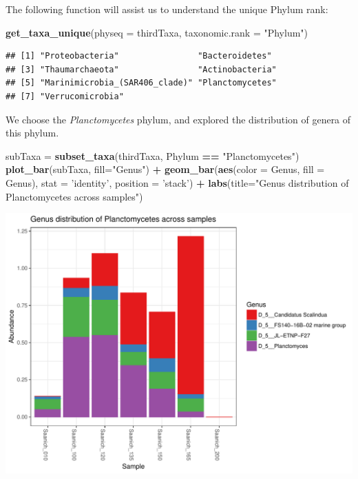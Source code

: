 \documentclass[11 pt,]{article}
\newenvironment{Shaded}{\begin{snugshade}}{\end{snugshade}}
\newcommand{\KeywordTok}[1]{\textcolor[rgb]{0.13,0.29,0.53}{\textbf{#1}}}
\newcommand{\DataTypeTok}[1]{\textcolor[rgb]{0.13,0.29,0.53}{#1}}
\newcommand{\StringTok}[1]{\textcolor[rgb]{0.31,0.60,0.02}{#1}}
\newcommand{\OperatorTok}[1]{\textcolor[rgb]{0.81,0.36,0.00}{\textbf{#1}}}
\newcommand{\NormalTok}[1]{#1}
\begin{document}
The following function will assist us to understand the unique Phylum
rank:

\begin{Shaded}
\begin{Highlighting}[]
\KeywordTok{get_taxa_unique}\NormalTok{(}\DataTypeTok{physeq =}\NormalTok{ thirdTaxa, }\DataTypeTok{taxonomic.rank =} \StringTok{"Phylum"}\NormalTok{)}
\end{Highlighting}
\end{Shaded}

\begin{verbatim}
## [1] "Proteobacteria"                "Bacteroidetes"                
## [3] "Thaumarchaeota"                "Actinobacteria"               
## [5] "Marinimicrobia_(SAR406_clade)" "Planctomycetes"               
## [7] "Verrucomicrobia"
\end{verbatim}

We choose the \emph{Planctomycetes} phylum, and explored the
distribution of genera of this phylum.

\begin{Shaded}
\begin{Highlighting}[]
\NormalTok{subTaxa =}\StringTok{ }\KeywordTok{subset_taxa}\NormalTok{(thirdTaxa, Phylum }\OperatorTok{==}\StringTok{ "Planctomycetes"}\NormalTok{)}
\KeywordTok{plot_bar}\NormalTok{(subTaxa, }\DataTypeTok{fill=}\StringTok{"Genus"}\NormalTok{) }\OperatorTok{+}\StringTok{ }
\StringTok{  }\KeywordTok{geom_bar}\NormalTok{(}\KeywordTok{aes}\NormalTok{(}\DataTypeTok{color =}\NormalTok{ Genus, }\DataTypeTok{fill =}\NormalTok{ Genus), }\DataTypeTok{stat =} \StringTok{'identity'}\NormalTok{, }
           \DataTypeTok{position =} \StringTok{'stack'}\NormalTok{) }\OperatorTok{+}
\StringTok{  }\KeywordTok{labs}\NormalTok{(}\DataTypeTok{title=}\StringTok{"Genus distribution of Planctomycetes across samples"}\NormalTok{)}
\end{Highlighting}
\end{Shaded}

\includegraphics{Figs/unnamed-chunk-9-1.pdf}
\end{document}
